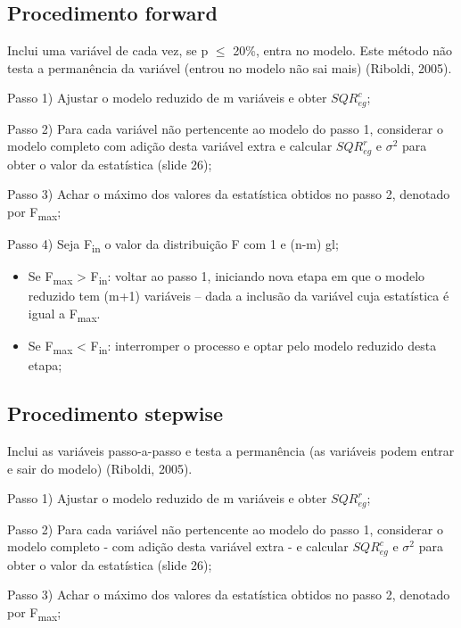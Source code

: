 \documentclass[12pt,brazil,]{book}
\begin{document}
\hypertarget{procedimento-forward}{%
\subsection{Procedimento forward}\label{procedimento-forward}}

Inclui uma variável de cada vez, se p \(\leq\) 20\%, entra no modelo.
Este método não testa a permanência da variável (entrou no modelo não
sai mais) (Riboldi, 2005).

Passo 1) Ajustar o modelo reduzido de m variáveis e obter
\(SQR^{c}_{eg}\);

Passo 2) Para cada variável não pertencente ao modelo do passo 1,
considerar o modelo completo com adição desta variável extra e calcular
\(SQR^{r}_{eg}\) e \(\sigma^{2}\) para obter o valor da estatística
(slide 26);

Passo 3) Achar o máximo dos valores da estatística obtidos no passo 2,
denotado por F\textsubscript{max};

Passo 4) Seja F\textsubscript{in} o valor da distribuição F com 1 e
(n-m) gl;

\begin{itemize}
\item
  Se F\textsubscript{max} \textgreater{} F\textsubscript{in}: voltar ao
  passo 1, iniciando nova etapa em que o modelo reduzido tem (m+1)
  variáveis -- dada a inclusão da variável cuja estatística é igual a
  F\textsubscript{max}.
\item
  Se F\textsubscript{max} \textless{} F\textsubscript{in}: interromper o
  processo e optar pelo modelo reduzido desta etapa;
\end{itemize}

\hypertarget{procedimento-stepwise}{%
\subsection{Procedimento stepwise}\label{procedimento-stepwise}}

Inclui as variáveis passo-a-passo e testa a permanência (as variáveis
podem entrar e sair do modelo) (Riboldi, 2005).

Passo 1) Ajustar o modelo reduzido de m variáveis e obter
\(SQR^{r}_{eg}\);

Passo 2) Para cada variável não pertencente ao modelo do passo 1,
considerar o modelo completo - com adição desta variável extra - e
calcular \(SQR^{c}_{eg}\) e \(\sigma^{2}\) para obter o valor da
estatística (slide 26);

Passo 3) Achar o máximo dos valores da estatística obtidos no passo 2,
denotado por F\textsubscript{max};
\end{document}
